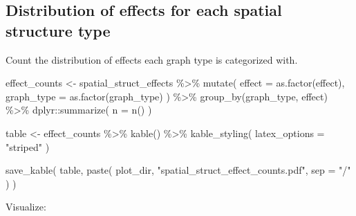 \documentclass[
]{book}
\newenvironment{Shaded}{\begin{snugshade}}{\end{snugshade}}
\newcommand{\AttributeTok}[1]{\textcolor[rgb]{0.77,0.63,0.00}{#1}}
\newcommand{\FunctionTok}[1]{\textcolor[rgb]{0.00,0.00,0.00}{#1}}
\newcommand{\NormalTok}[1]{#1}
\newcommand{\OtherTok}[1]{\textcolor[rgb]{0.56,0.35,0.01}{#1}}
\newcommand{\SpecialCharTok}[1]{\textcolor[rgb]{0.00,0.00,0.00}{#1}}
\newcommand{\StringTok}[1]{\textcolor[rgb]{0.31,0.60,0.02}{#1}}
\begin{document}
\hypertarget{distribution-of-effects-for-each-spatial-structure-type}{%
\subsection{Distribution of effects for each spatial structure type}\label{distribution-of-effects-for-each-spatial-structure-type}}

Count the distribution of effects each graph type is categorized with.

\begin{Shaded}
\begin{Highlighting}[]
\NormalTok{effect\_counts }\OtherTok{\textless{}{-}}\NormalTok{ spatial\_struct\_effects }\SpecialCharTok{\%\textgreater{}\%}
  \FunctionTok{mutate}\NormalTok{(}
    \AttributeTok{effect =} \FunctionTok{as.factor}\NormalTok{(effect),}
    \AttributeTok{graph\_type =} \FunctionTok{as.factor}\NormalTok{(graph\_type)}
\NormalTok{  ) }\SpecialCharTok{\%\textgreater{}\%}
  \FunctionTok{group\_by}\NormalTok{(graph\_type, effect) }\SpecialCharTok{\%\textgreater{}\%}
\NormalTok{  dplyr}\SpecialCharTok{::}\FunctionTok{summarize}\NormalTok{(}
    \AttributeTok{n =} \FunctionTok{n}\NormalTok{()}
\NormalTok{  )}

\NormalTok{table }\OtherTok{\textless{}{-}}\NormalTok{ effect\_counts }\SpecialCharTok{\%\textgreater{}\%}
  \FunctionTok{kable}\NormalTok{() }\SpecialCharTok{\%\textgreater{}\%}
  \FunctionTok{kable\_styling}\NormalTok{(}
    \AttributeTok{latex\_options =} \StringTok{"striped"}
\NormalTok{  )}

\FunctionTok{save\_kable}\NormalTok{(}
\NormalTok{  table,}
  \FunctionTok{paste}\NormalTok{(}
\NormalTok{    plot\_dir,}
    \StringTok{"spatial\_struct\_effect\_counts.pdf"}\NormalTok{,}
    \AttributeTok{sep =} \StringTok{"/"}
\NormalTok{  )}
\NormalTok{)}
\end{Highlighting}
\end{Shaded}

Visualize:
\end{document}
